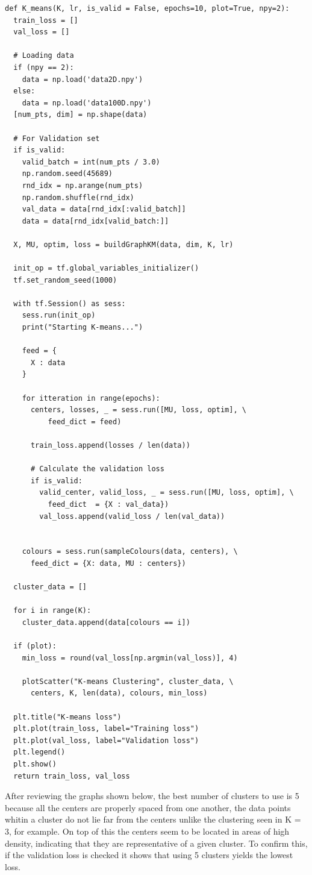 \documentclass[12pt]{article}
\begin{document}
\begin{verbatim}
def K_means(K, lr, is_valid = False, epochs=10, plot=True, npy=2):
  train_loss = []
  val_loss = []

  # Loading data
  if (npy == 2):
    data = np.load('data2D.npy')
  else:
    data = np.load('data100D.npy')
  [num_pts, dim] = np.shape(data)

  # For Validation set
  if is_valid:
    valid_batch = int(num_pts / 3.0)
    np.random.seed(45689)
    rnd_idx = np.arange(num_pts)
    np.random.shuffle(rnd_idx)
    val_data = data[rnd_idx[:valid_batch]]
    data = data[rnd_idx[valid_batch:]]
  
  X, MU, optim, loss = buildGraphKM(data, dim, K, lr)

  init_op = tf.global_variables_initializer()
  tf.set_random_seed(1000)

  with tf.Session() as sess:
    sess.run(init_op)
    print("Starting K-means...")

    feed = {
      X : data
    }

    for itteration in range(epochs):
      centers, losses, _ = sess.run([MU, loss, optim], \
          feed_dict = feed)

      train_loss.append(losses / len(data))

      # Calculate the validation loss
      if is_valid:
        valid_center, valid_loss, _ = sess.run([MU, loss, optim], \ 
          feed_dict  = {X : val_data})
        val_loss.append(valid_loss / len(val_data))


    colours = sess.run(sampleColours(data, centers), \
      feed_dict = {X: data, MU : centers})
  
  cluster_data = []

  for i in range(K):
    cluster_data.append(data[colours == i])

  if (plot):
    min_loss = round(val_loss[np.argmin(val_loss)], 4)

    plotScatter("K-means Clustering", cluster_data, \ 
      centers, K, len(data), colours, min_loss)

  plt.title("K-means loss")
  plt.plot(train_loss, label="Training loss")
  plt.plot(val_loss, label="Validation loss")
  plt.legend()
  plt.show()
  return train_loss, val_loss
\end{verbatim}

\begin{flushleft}
    After reviewing the graphs shown below, the best number of clusters to use is 
    5 because all the centers are properly spaced from one another, the data points whitin 
    a cluster do not lie far from the centers unlike the clustering seen in K = 3, for example.
    On top of this the centers seem to be located in areas of high density, indicating that they 
    are representative of a given cluster.
    To confirm this, if the validation loss is checked it shows that using 5 clusters yields the 
    lowest loss.
\end{flushleft}
\end{document}
